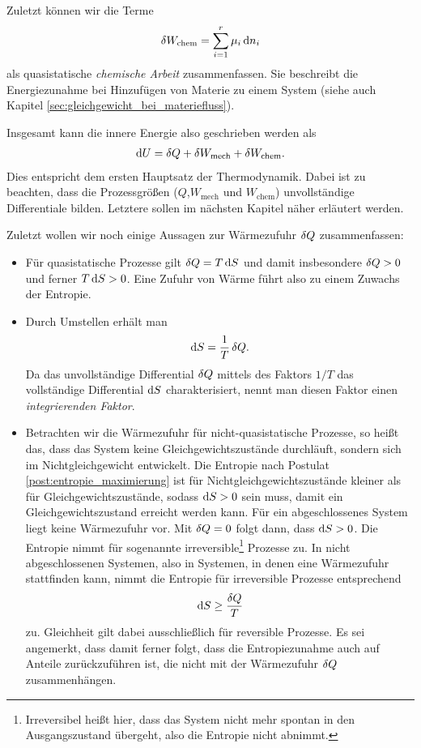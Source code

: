 Zuletzt können wir die Terme
\begin{align*}
    \mathop{}\!\delta W_\mathrm{chem} = \sum_{i = 1}^r \mu_i\mathop{}\!\mathrm{d} n_i
\end{align*}
als quasistatische \emph{chemische Arbeit} zusammenfassen. Sie beschreibt die Energiezunahme bei Hinzufügen von Materie zu einem System (siehe auch Kapitel \ref{sec:gleichgewicht_bei_materiefluss}).

Insgesamt kann die innere Energie also geschrieben werden als
\begin{align}
    \label{eq:erster_HS_TD}
    \mathop{}\!\mathrm{d} U = \mathop{}\!\delta Q + \mathop{}\!\delta W_\mathrm{mech} + \mathop{}\!\delta W_\mathrm{chem}.
\end{align}
Dies entspricht dem ersten Hauptsatz der Thermodynamik.
Dabei ist zu beachten, dass die Prozessgrößen ($Q$,$W_\mathrm{mech}$ und $W_\mathrm{chem}$) unvollständige Differentiale bilden. Letztere sollen im nächsten Kapitel näher erläutert werden.

Zuletzt wollen wir noch einige Aussagen zur Wärmezufuhr $\mathop{}\!\delta Q$ zusammenfassen:
\begin{itemize}
    \item Für quasistatische Prozesse gilt $\mathop{}\!\delta Q=T\mathop{}\!\mathrm{d} S$ und damit insbesondere $\mathop{}\!\delta Q>0$ und ferner $T\mathop{}\!\mathrm{d} S>0$. Eine Zufuhr von Wärme führt also zu einem Zuwachs der Entropie.
    \item Durch Umstellen erhält man
          \begin{align*}
              \mathop{}\!\mathrm{d} S = \frac{1}{T}\mathop{}\!\delta Q.
          \end{align*}
          Da das unvollständige Differential $\mathop{}\!\delta Q$ mittels des Faktors $1/T$ das vollständige Differential $\mathop{}\!\mathrm{d} S$ charakterisiert, nennt man diesen Faktor einen \emph{integrierenden Faktor}.
    \item Betrachten wir die Wärmezufuhr für nicht-quasistatische Prozesse, so heißt das, dass das System keine Gleichgewichtszustände durchläuft, sondern sich im Nichtgleichgewicht entwickelt. Die Entropie nach Postulat \ref{post:entropie_maximierung} ist für Nichtgleichgewichtszustände kleiner als für Gleichgewichtszustände, sodass $\mathop{}\!\mathrm{d} S > 0$ sein muss, damit ein Gleichgewichtszustand erreicht werden kann.
          Für ein abgeschlossenes System liegt keine Wärmezufuhr vor. Mit $\mathop{}\!\delta Q=0$ folgt dann, dass  $\mathop{}\!\mathrm{d} S >0$. Die Entropie nimmt für sogenannte irreversible\footnote{Irreversibel heißt hier, dass das System nicht mehr spontan in den Ausgangszustand übergeht, also die Entropie nicht abnimmt.} Prozesse zu. In nicht abgeschlossenen Systemen, also in Systemen, in denen eine Wärmezufuhr stattfinden kann, nimmt die Entropie für irreversible Prozesse entsprechend
          \begin{align*}
              \mathop{}\!\mathrm{d} S\geq \frac{\mathop{}\!\delta Q}{T}
          \end{align*}
          zu.
          Gleichheit gilt dabei ausschließlich für reversible Prozesse. Es sei angemerkt, dass damit ferner folgt, dass die Entropiezunahme auch auf Anteile zurückzuführen ist, die nicht mit der Wärmezufuhr $\mathop{}\!\delta Q$ zusammenhängen.
\end{itemize}

